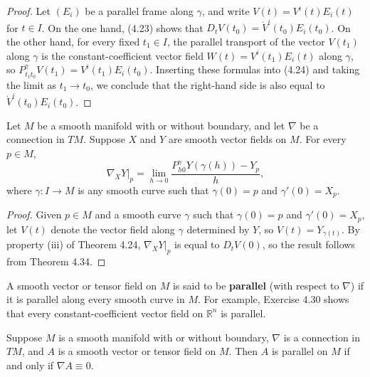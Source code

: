\begin{proof}
Let $(E_i)$ be a parallel frame along $\gamma$, and write $V(t) = V^i(t) E_i(t)$ for $t \in I$. On the one hand, (4.23) shows that $D_t V(t_0) = \dot{V}^i(t_0) E_i(t_0)$. On the other hand, for every fixed $t_1 \in I$, the parallel transport of the vector $V(t_1)$ along $\gamma$ is the constant-coefficient vector field $W(t) = V^i(t_1) E_i(t)$ along $\gamma$, so $P_{t_1 t_0}^{\gamma} V(t_1) = V^i(t_1) E_i(t_0)$. Inserting these formulas into (4.24) and taking the limit as $t_1 \to t_0$, we conclude that the right-hand side is also equal to $\dot{V}^i(t_0) E_i(t_0)$.
\end{proof}

\begin{corollary}
\label{cor:parallel-transport-determines-connection}
Let $M$ be a smooth manifold with or without boundary, and let $\nabla$ be a connection in $TM$. Suppose $X$ and $Y$ are smooth vector fields on $M$. For every $p \in M$,
\begin{equation}
\nabla_X Y|_p = \lim_{h \to 0} \frac{P_{h0}^{\gamma} Y(\gamma(h)) - Y_p}{h}, \tag{4.25}
\end{equation}
where $\gamma : I \to M$ is any smooth curve such that $\gamma(0) = p$ and $\gamma'(0) = X_p$.
\end{corollary}

\begin{proof}
Given $p \in M$ and a smooth curve $\gamma$ such that $\gamma(0) = p$ and $\gamma'(0) = X_p$, let $V(t)$ denote the vector field along $\gamma$ determined by $Y$, so $V(t) = Y_{\gamma(t)}$. By property (iii) of Theorem 4.24, $\nabla_X Y |_p$ is equal to $D_t V(0)$, so the result follows from Theorem 4.34.
\end{proof}

A smooth vector or tensor field on $M$ is said to be \textbf{parallel} (with respect to $\nabla$) if it is parallel along every smooth curve in $M$. For example, Exercise 4.30 shows that every constant-coefficient vector field on $\mathbb{R}^n$ is parallel.

\begin{proposition}
\label{prop:parallel-field-characterization}
Suppose $M$ is a smooth manifold with or without boundary, $\nabla$ is a connection in $TM$, and $A$ is a smooth vector or tensor field on $M$. Then $A$ is parallel on $M$ if and only if $\nabla A \equiv 0$.
\end{proposition}

